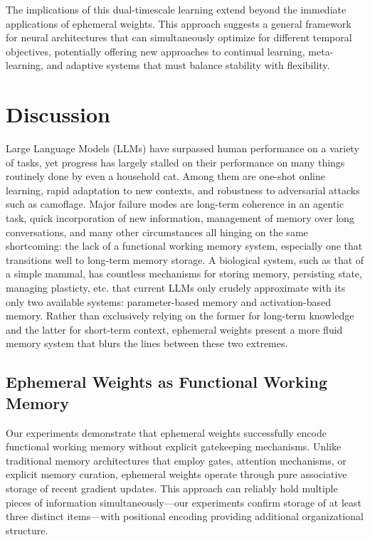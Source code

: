 \documentclass[conference]{IEEEtran}
\begin{document}
The implications of this dual-timescale learning extend beyond the immediate applications of ephemeral weights. This approach suggests a general framework for neural architectures that can simultaneously optimize for different temporal objectives, potentially offering new approaches to continual learning, meta-learning, and adaptive systems that must balance stability with flexibility.

\section{Discussion}

Large Language Models (LLMs) have surpassed human performance on a variety of tasks, yet progress has largely stalled on their performance on many things routinely done by even a household cat. Among them are one-shot online learning, rapid adaptation to new contexts, and robustness to adversarial attacks such as camoflage. Major failure modes are long-term coherence in an agentic task, quick incorporation of new information, management of memory over long conversations, and many other circumstances all hinging on the same shortcoming: the lack of a functional working memory system, especially one that transitions well to long-term memory storage. A biological system, such as that of a simple mammal, has countless mechanisms for storing memory, persisting state, managing plasticty, etc. that current LLMs only crudely approximate with its only two available systems: parameter-based memory and activation-based memory. Rather than exclusively relying on the former for long-term knowledge and the latter for short-term context, ephemeral weights present a more fluid memory system that blurs the lines between these two extremes.

\subsection{Ephemeral Weights as Functional Working Memory}

Our experiments demonstrate that ephemeral weights successfully encode functional working memory without explicit gatekeeping mechanisms. Unlike traditional memory architectures that employ gates, attention mechanisms, or explicit memory curation, ephemeral weights operate through pure associative storage of recent gradient updates. This approach can reliably hold multiple pieces of information simultaneously—our experiments confirm storage of at least three distinct items—with positional encoding providing additional organizational structure.
\end{document}

